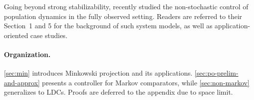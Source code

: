 Going beyond strong stabilizability, \citet{golowich2024online} recently studied the non-stochastic control of population dynamics in the fully observed setting. Readers are referred to their Section~1 and 5 for the background of such system models, as well as application-oriented case studies. 


\paragraph{Organization.} 
\cref{sec:min} introduces Minkowski projection and its applications. \cref{sec:po-prelim-and-approx} presents a controller for Markov comparators, while \cref{sec:non-markov} generalizes to LDCs. Proofs are deferred to the appendix due to space limit. 
